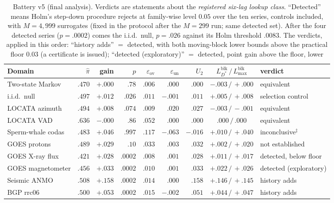 \documentclass[11pt]{article}
\begin{document}
\begin{table}[h]\centering\footnotesize
\begin{tabular}{lrrrrrrcl}
\toprule
Domain & $\hat\pi$ & gain & $p$ & $\varepsilon_{\mathrm{ov}}$ &
$\varepsilon_{\mathrm{un}}$ & $U_2$ & $L^{\mathrm{blk}}_{D^*}\,/\,L^{\mathrm{blk}}_{\max}$ & verdict \\
\midrule
Two-state Markov & $.470$ & $+.000$ & $.78$ & $.006$ & $.000$ & $.000$ & $-.003\,/\,+.000$ & equivalent \\
i.i.d.\ null & $.497$ & $+.012$ & $.026$ & $.011$ & $-.001$ & $.011$ & $+.005\,/\,+.008$ & selection control \\
LOCATA azimuth & $.494$ & $+.008$ & $.074$ & $.009$ & $.020$ & $.027$ & $-.003\,/\,-.001$ & equivalent \\
LOCATA VAD & $.636$ & $-.000$ & $.86$ & $.052$ & $.000$ & $.000$ & $.000\,/\,.000$ & equivalent \\
Sperm-whale codas & $.483$ & $+.046$ & $.997$ & $.117$ & $-.063$ & $-.016$ & $+.010\,/\,+.040$ & inconclusive$^{\ddagger}$ \\
GOES protons & $.489$ & $+.029$ & $.10$ & $.033$ & $.003$ & $.032$ & $+.002\,/\,+.020$ & not established \\
GOES X-ray flux & $.421$ & $+.028$ & $.0002$ & $.008$ & $.001$ & $.028$ & $+.011\,/\,+.017$ & detected, below floor \\
GOES magnetometer & $.456$ & $+.033$ & $.0002$ & $.010$ & $.001$ & $.033$ & $+.022\,/\,+.026$ & detected (exploratory) \\
Seismic ANMO & $.508$ & $+.158$ & $.0002$ & $.014$ & $.000$ & $.158$ & $\mathbf{+.146\,/\,+.145}$ & history adds \\
BGP rrc06 & $.500$ & $+.053$ & $.0002$ & $.015$ & $-.002$ & $.051$ & $+.044\,/\,+.047$ & history adds \\
\bottomrule
\end{tabular}
\caption{Battery v5 (final analysis). Verdicts are statements about the
\emph{registered six-lag lookup class}. ``Detected'' means Holm's
step-down procedure rejects at family-wise level $0.05$ over the ten
series, controls included, with $M=4{,}999$ surrogates (fixed in the
protocol after the $M=299$ run; same detected set). After the four detected series ($p=.0002$) comes the
i.i.d.\ null, $p=.026$ against its Holm threshold $.0083$. The verdicts, applied
in this order: ``history adds'' $=$ detected, with both moving-block lower
bounds above the practical floor $0.03$ (a certificate is issued);
``detected (exploratory)'' $=$ detected, point gain above the floor, lower
}
\end{table}
\end{document}
